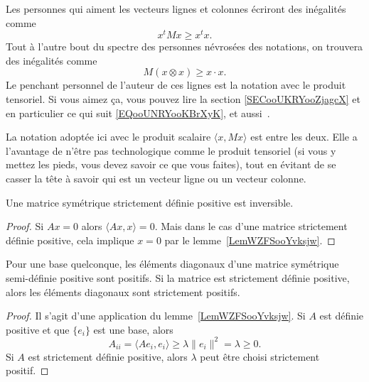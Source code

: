 Les personnes qui aiment les vecteurs lignes et colonnes écriront des inégalités comme
\begin{equation}
    x^tMx\geq x^tx.
\end{equation}
Tout à l'autre bout du spectre des personnes névrosées des notations, on trouvera des inégalités comme
\begin{equation}
    M(x\otimes x)\geq x\cdot x.
\end{equation}
Le penchant personnel de l'auteur de ces lignes est la notation avec le produit tensoriel. Si vous aimez ça, vous pouvez lire la section \ref{SECooUKRYooZjagcX} et en particulier ce qui suit \eqref{EQooUNRYooKBrXyK}, et aussi~\cite{SeOOpHsn}.

La notation adoptée ici avec le produit scalaire \( \langle x, Mx\rangle \) est entre les deux. Elle a l'avantage de n'être pas technologique comme le produit tensoriel (si vous y mettez les pieds, vous devez savoir ce que vous faites), tout en évitant de se casser la tête à savoir qui est un vecteur ligne ou un vecteur colonne.

\begin{corollary}
    Une matrice symétrique strictement définie positive est inversible.
\end{corollary}

\begin{proof}
    Si \( Ax=0\) alors \( \langle Ax, x\rangle =0\). Mais dans le cas d'une matrice strictement définie positive, cela implique \( x=0\) par le lemme~\ref{LemWZFSooYvksjw}.
\end{proof}

\begin{lemma}
    Pour une base quelconque, les éléments diagonaux d'une matrice symétrique semi-définie positive sont positifs. Si la matrice est strictement définie positive, alors les éléments diagonaux sont strictement positifs.
\end{lemma}

\begin{proof}
    Il s'agit d'une application du lemme~\ref{LemWZFSooYvksjw}. Si \( A\) est définie positive et que \( \{ e_i \}\) est une base, alors
    \begin{equation}
        A_{ii}=\langle Ae_i, e_i\rangle \geq \lambda\| e_i \|^2=\lambda\geq 0.
    \end{equation}
    Si \( A\) est strictement définie positive, alors \( \lambda\) peut être choisi strictement positif.
\end{proof}

